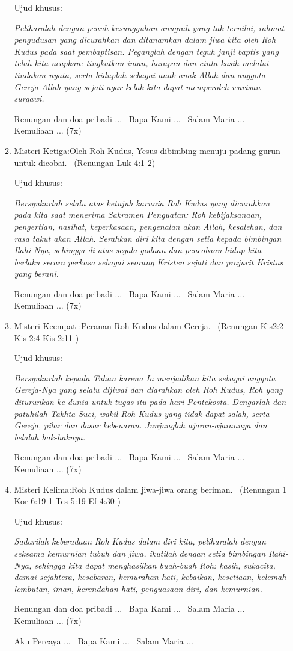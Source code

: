 \begin{enumerate}
\begin{enumerate}
Ujud khusus:~

\textit{Peliharalah dengan penuh kesungguhan anugrah yang tak ternilai, rahmat
pengudusan yang dicurahkan dan ditanamkan dalam jiwa kita oleh Roh
Kudus pada saat pembaptisan. Peganglah dengan teguh janji baptis yang
telah kita ucapkan: tingkatkan iman, harapan dan cinta kasih melalui
tindakan nyata, serta hiduplah sebagai anak-anak Allah dan anggota
Gereja Allah yang sejati agar kelak kita dapat memperoleh warisan
surgawi.}

Renungan dan doa pribadi ...~ Bapa Kami ...~ Salam Maria ...~ Kemuliaan
... (7x)

\item Misteri Ketiga:{\textquotedbl}Oleh Roh Kudus, Yesus dibimbing menuju
padang gurun untuk dicobai.{\textquotedbl}~ (Renungan Luk 4:1-2)

Ujud khusus:~

\textit{Bersyukurlah selalu atas ketujuh karunia Roh Kudus yang dicurahkan pada
kita saat menerima Sakramen Penguatan: Roh kebijaksanaan, pengertian,
nasihat, keperkasaan, pengenalan akan Allah, kesalehan, dan rasa takut
akan Allah. Serahkan diri kita dengan setia kepada bimbingan Ilahi-Nya,
sehingga di atas segala godaan dan pencobaan hidup kita berlaku secara
perkasa sebagai seorang Kristen sejati dan prajurit Kristus yang
berani.}

Renungan dan doa pribadi ...~ Bapa Kami ...~ Salam Maria ...~ Kemuliaan
... (7x)

\item Misteri Keempat :{\textquotedbl}Peranan Roh Kudus dalam
Gereja.{\textquotedbl}~ (Renungan Kis2:2 Kis 2:4 Kis 2:11 )

Ujud khusus:~

\textit{Bersyukurlah kepada Tuhan karena Ia menjadikan kita sebagai anggota
Gereja-Nya yang selalu dijiwai dan diarahkan oleh Roh Kudus, Roh yang
diturunkan ke dunia untuk tugas itu pada hari Pentekosta. Dengarlah dan
patuhilah Takhta Suci, wakil Roh Kudus yang tidak dapat salah, serta
Gereja, pilar dan dasar kebenaran. Junjunglah ajaran-ajarannya dan
belalah hak-haknya.}

Renungan dan doa pribadi ...~ Bapa Kami ...~ Salam Maria ...~ Kemuliaan
... (7x)

\item Misteri Kelima:{\textquotedbl}Roh Kudus dalam jiwa-jiwa orang
beriman.{\textquotedbl}~ (Renungan 1 Kor 6:19 1 Tes 5:19 Ef 4:30 )

Ujud khusus:~

\textit{Sadarilah keberadaan Roh Kudus dalam diri kita, peliharalah dengan
seksama kemurnian tubuh dan jiwa, ikutilah dengan setia bimbingan
Ilahi-Nya, sehingga kita dapat menghasilkan buah-buah Roh: kasih,
sukacita, damai sejahtera, kesabaran, kemurahan hati, kebaikan,
kesetiaan, kelemah lembutan, iman, kerendahan hati, penguasaan diri,
dan kemurnian.}

Renungan dan doa pribadi ...~ Bapa Kami ...~ Salam Maria ...~ Kemuliaan
... (7x)~  

Aku Percaya ...~ Bapa Kami ...~ Salam Maria ...
\end{enumerate}
\end{enumerate}

